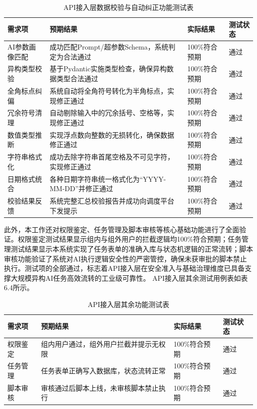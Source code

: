 \begin{table}[htbp]
\centering
\caption{API接入层数据校验与自动纠正功能测试表}
\begin{tabularx}{\textwidth}{lXll}
\toprule
\textbf{需求项} & \textbf{预期结果} & \textbf{实际结果} & \textbf{测试状态} \\
\midrule
AI参数画像匹配 & 成功匹配Prompt/超参数Schema，系统判定为合法通过 & 100\%符合预期 & 通过 \\
异构类型校验   & 基于Pydantic实施类型检查，确保异构数据类型合法通过 & 100\%符合预期 & 通过 \\
全角标点纠偏   & 系统自动将全角符号转化为半角标点，实现修正通过 & 100\%符合预期 & 通过 \\
冗余符号清理   & 自动剔除输入中的冗余括号、空格等，实现修正通过 & 100\%符合预期 & 通过 \\
数值类型推断   & 实现浮点数向整数的无损转化，确保数据修正通过 & 100\%符合预期 & 通过 \\
字符串格式化   & 成功去除字符串首尾空格及不可见字符，实现修正通过 & 100\%符合预期 & 通过 \\
日期格式统合   & 各种日期字符串统一格式化为“YYYY-MM-DD”并修正通过 & 100\%符合预期 & 通过 \\
校验结果反馈   & 系统完整汇总校验报告并成功向调度平台下发提示 & 100\%符合预期 & 通过 \\
\bottomrule
\end{tabularx}
\label{tab:api_access_test}
\end{table}

此外，本工作还对权限鉴定、任务管理及脚本审核等核心基础功能进行了全面验证。权限鉴定测试结果显示组内与组外用户的拦截逻辑均100\%符合预期；任务管理测试结果显示本系统实现了任务表单的准确入库与状态机逻辑的正常流转；脚本审核功能验证了系统对AI执行逻辑安全性的严密管控，确保未获审批的脚本禁止执行。测试项的全部通过，标志着API接入层在安全准入与基础治理维度已具备支撑大规模异构AI任务高效流转的工业级可靠性。
API接入层其余测试用例表如表6.4所示。

\begin{table}[htbp]
\centering
\caption{API接入层其余功能测试表}
\begin{tabularx}{\textwidth}{lXll}
\toprule
\textbf{需求项} & \textbf{预期结果} & \textbf{实际结果} & \textbf{测试状态} \\
\midrule
权限鉴定 & 组内用户通过，组外用户拦截并提示无权限 & 100\%符合预期 & 通过 \\
任务管理 & 任务表单正确写入数据库，状态流转正常 & 100\%符合预期 & 通过 \\
脚本审核 & 审核通过后脚本上线，未审核脚本禁止执行 & 100\%符合预期 & 通过 \\
\bottomrule
\end{tabularx}
\end{table}

